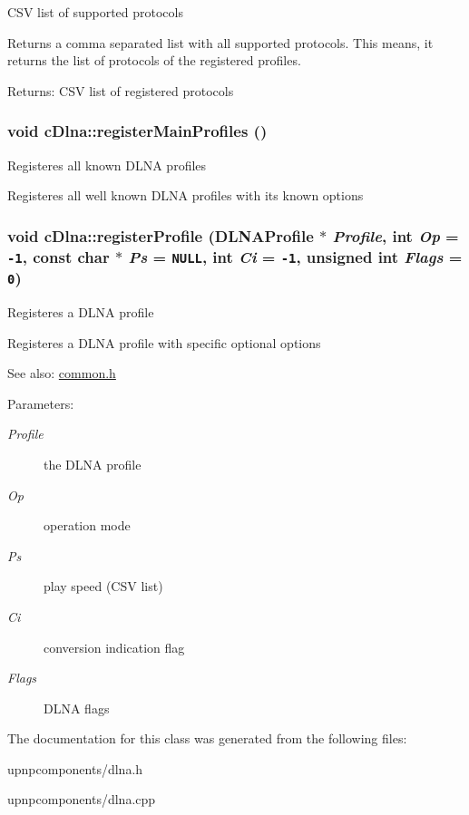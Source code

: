 CSV list of supported protocols

Returns a comma separated list with all supported protocols. This means, it returns the list of protocols of the registered profiles.

\begin{Desc}
\item[Returns:]CSV list of registered protocols \end{Desc}
\hypertarget{classcDlna_e26b723ec63a60f397ce41bd95641dfa}{
\subsubsection[{registerMainProfiles}]{\setlength{\rightskip}{0pt plus 5cm}void cDlna::registerMainProfiles ()}}
\label{classcDlna_e26b723ec63a60f397ce41bd95641dfa}


Registeres all known DLNA profiles

Registeres all well known DLNA profiles with its known options \hypertarget{classcDlna_0250d3903e7dcbdc8ebadfacd4e6fb50}{
\subsubsection[{registerProfile}]{\setlength{\rightskip}{0pt plus 5cm}void cDlna::registerProfile ({\bf DLNAProfile} $\ast$ {\em Profile}, \/  int {\em Op} = {\tt -1}, \/  const char $\ast$ {\em Ps} = {\tt NULL}, \/  int {\em Ci} = {\tt -1}, \/  unsigned int {\em Flags} = {\tt 0})}}
\label{classcDlna_0250d3903e7dcbdc8ebadfacd4e6fb50}


Registeres a DLNA profile

Registeres a DLNA profile with specific optional options

\begin{Desc}
\item[See also:]\hyperlink{common_8h-source}{common.h} \end{Desc}
\begin{Desc}
\item[Parameters:]
\begin{description}
\item[{\em Profile}]the DLNA profile \item[{\em Op}]operation mode \item[{\em Ps}]play speed (CSV list) \item[{\em Ci}]conversion indication flag \item[{\em Flags}]DLNA flags \end{description}
\end{Desc}


The documentation for this class was generated from the following files:\begin{CompactItemize}
\item 
upnpcomponents/dlna.h\item 
upnpcomponents/dlna.cpp\end{CompactItemize}
